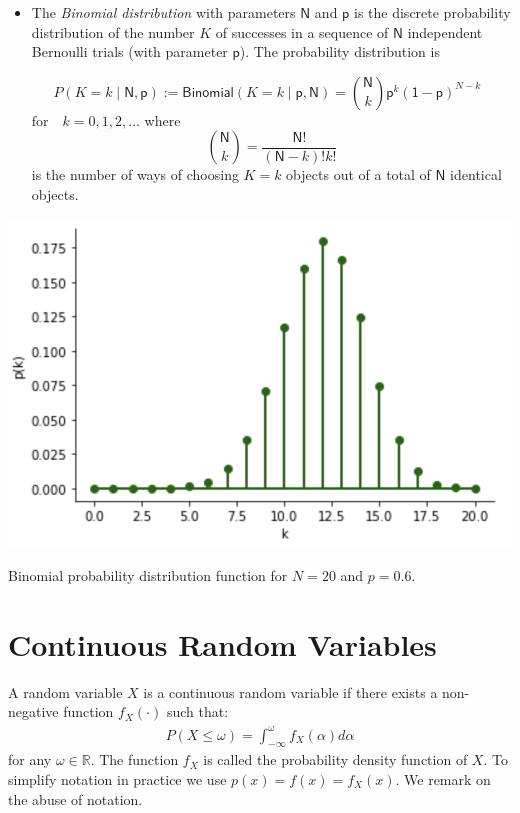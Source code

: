 \documentclass{tufte-handout}
\begin{document}
\begin{itemize}
\begin{marginfigure}
\caption{Binomial probability distribution function for $N=20$ and $p=0.5$.
}
\end{marginfigure}

\item The \textit{Binomial distribution} with parameters $\mathsf N$ and $\mathsf p$ is the discrete probability distribution of the number $K$ of successes in a sequence of $\mathsf N$ independent Bernoulli trials (with parameter $\mathsf p$). The probability distribution is

\begin{equation*}
P(K=k\mid {\mathsf N},\mathsf p) := \mathsf{Binomial}(K=k\mid \mathsf p,\mathsf N)  = {{\mathsf N}\choose k} \mathsf p^k\mathsf{(1- p)}^{{N}-k} \,\,\,\, 
\end{equation*}
$ \text{for } \,\,\,\, k = 0,1,2,\dots$ where $${{\mathsf N}\choose k} = \frac{{\mathsf N}!}{({\mathsf N}-k)!k!}$$ is the number of ways of choosing $K=k$ objects out of a total of $ \mathsf N$ identical objects.
\end{itemize}

\begin{marginfigure}
\centering
\includegraphics{fig/binomial2.png}

\caption{Binomial probability distribution function for $N=20$ and $p=0.6$.
}
\end{marginfigure}


\section{Continuous Random Variables }

A random variable $X$ is a continuous random variable if there exists a non-negative function $f_X(\cdot)$ such that:
\begin{align*}
P(X\leq \omega) = \int_{-\infty}^\omega f_X(\alpha)d\alpha
\end{align*}
for any $\omega\in \mathbb R$. The function $f_X$ is called the probability density function of $X$. To simplify notation in practice we use $p(x) = f(x) = f_X(x)$. We remark on the abuse of notation.
\end{document}
